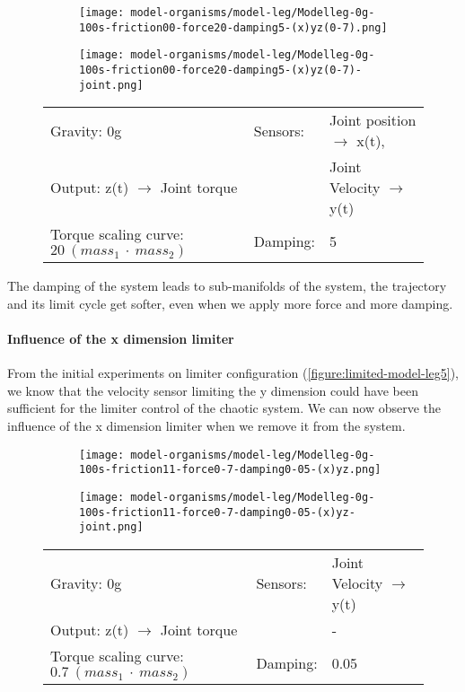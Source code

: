 \documentclass[main]{subfiles}
\begin{document}
\begin{figure}[H]
	\centering
		\begin{subfigure}[c]{0.45\textwidth}
	\texttt{[image: model-organisms/model-leg/Modelleg-0g-100s-friction00-force20-damping5-(x)yz(0-7).png]}
		\end{subfigure}
	\begin{subfigure}[c]{0.45\textwidth}
	\texttt{[image: model-organisms/model-leg/Modelleg-0g-100s-friction00-force20-damping5-(x)yz(0-7)-joint.png]}
		\end{subfigure}
	\caption[Limited chaotic controller controlling model leg]{}
	\begin{tabular}{l|ll}
	\hline 
	Gravity: 0g  & Sensors: & Joint position \(\rightarrow\) x(t),\\
	 Output: z(t) \(\rightarrow\) Joint torque &  & Joint Velocity \(\rightarrow\) y(t) \\
	  Torque scaling curve: \(20~(mass_1~\cdot~mass_2)\) & Damping: & 5 \\
	  \hline
	\end{tabular}

	\label{figure:limited-damped-model-leg-damping4}
\end{figure}

The damping of the system leads to sub-manifolds of the system, the trajectory and its limit cycle get softer, even when we apply more force and more damping.

\paragraph{Influence of the x dimension limiter} From the initial experiments on limiter configuration (\ref{figure:limited-model-leg5}), we know that the velocity sensor limiting the y dimension could have been sufficient for the limiter control of the chaotic system. We can now observe the influence of the x dimension limiter when we remove it from the system.

\begin{figure}[H]
	\centering
		\begin{subfigure}[c]{0.45\textwidth}
	\texttt{[image: model-organisms/model-leg/Modelleg-0g-100s-friction11-force0-7-damping0-05-(x)yz.png]}
		\end{subfigure}
	\begin{subfigure}[c]{0.45\textwidth}
	\texttt{[image: model-organisms/model-leg/Modelleg-0g-100s-friction11-force0-7-damping0-05-(x)yz-joint.png]}
		\end{subfigure}
	\caption[Limited chaotic controller controlling model leg]{}
	\begin{tabular}{l|ll}
	\hline 
	Gravity: 0g  & Sensors: & Joint Velocity \(\rightarrow\) y(t)\\
	 Output: z(t) \(\rightarrow\) Joint torque & & - \\
	  Torque scaling curve: \(0.7~(mass_1~\cdot~mass_2)\) & Damping: & 0.05 \\
	  \hline
	\end{tabular}

	\label{figure:limited-damped-model-leg4}
\end{figure}
\end{document}
